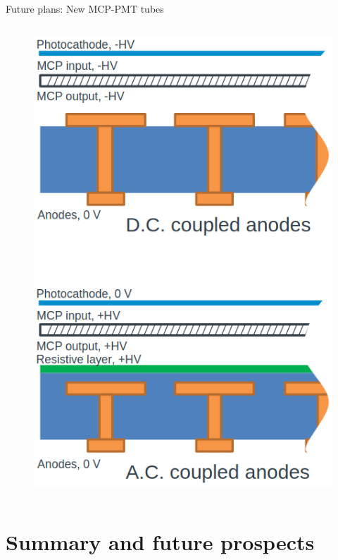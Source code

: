 \documentclass[xcolor={dvipsnames}]{beamer}
\begin{document}
\begin{frame}{Future plans: New MCP-PMT tubes}
\begin{columns}
\begin{column}{0.4\textwidth}
\begin{figure}
        \includegraphics[width = 1.0\textwidth]{Figs/ACvsDCCoupledAnode.png}
      \end{figure}
    \end{column}
  \end{columns}
\end{frame}

\section{Summary and future prospects}
\end{document}
